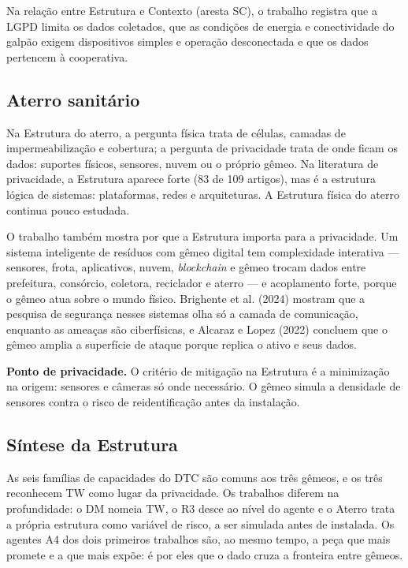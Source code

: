 \documentclass[12pt,a4paper,article,oneside,english,brazil]{abntex2}
\begin{document}
Na relação entre Estrutura e Contexto (aresta SC), o trabalho registra que a LGPD limita os dados coletados, que as condições de energia e conectividade do galpão exigem dispositivos simples e operação desconectada e que os dados pertencem à cooperativa.

\subsection{Aterro sanitário}

Na Estrutura do aterro, a pergunta física trata de células, camadas de impermeabilização e cobertura; a pergunta de privacidade trata de onde ficam os dados: suportes físicos, sensores, nuvem ou o próprio gêmeo. Na literatura de privacidade, a Estrutura aparece forte (83 de 109 artigos), mas é a estrutura lógica de sistemas: plataformas, redes e arquiteturas. A Estrutura física do aterro continua pouco estudada.

O trabalho também mostra por que a Estrutura importa para a privacidade. Um sistema inteligente de resíduos com gêmeo digital tem complexidade interativa --- sensores, frota, aplicativos, nuvem, \textit{blockchain} e gêmeo trocam dados entre prefeitura, consórcio, coletora, reciclador e aterro --- e acoplamento forte, porque o gêmeo atua sobre o mundo físico. Brighente et al. (2024) mostram que a pesquisa de segurança nesses sistemas olha só a camada de comunicação, enquanto as ameaças são ciberfísicas, e Alcaraz e Lopez (2022) concluem que o gêmeo amplia a superfície de ataque porque replica o ativo e seus dados.

\textbf{Ponto de privacidade.} O critério de mitigação na Estrutura é a minimização na origem: sensores e câmeras só onde necessário. O gêmeo simula a densidade de sensores contra o risco de reidentificação antes da instalação.

\subsection{Síntese da Estrutura}

As seis famílias de capacidades do DTC são comuns aos três gêmeos, e os três reconhecem TW como lugar da privacidade. Os trabalhos diferem na profundidade: o DM nomeia TW, o R3 desce ao nível do agente e o Aterro trata a própria estrutura como variável de risco, a ser simulada antes de instalada. Os agentes A4 dos dois primeiros trabalhos são, ao mesmo tempo, a peça que mais promete e a que mais expõe: é por eles que o dado cruza a fronteira entre gêmeos.
\end{document}
